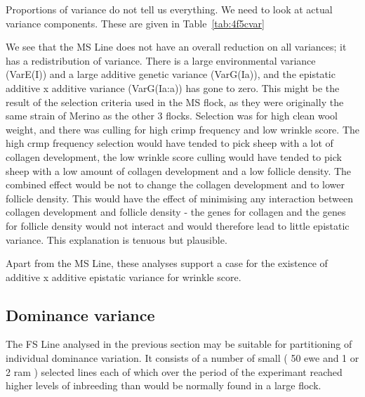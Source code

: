 \documentclass[titlepage]{article}  %
\begin{document}
Proportions of variance do not tell us everything. We need to look at actual variance components. These are given in Table~\ref{tab:4f5cvar}

We see that the MS Line does not have an overall reduction on all variances; it has a redistribution of variance. There is a large environmental variance (VarE(I)) and a large additive genetic variance (VarG(Ia)), and the epistatic additive x additive variance (VarG(Ia:a)) has gone to zero. This might be the result of the selection criteria used in the MS flock, as they were originally the same strain of Merino as the other 3 flocks.  Selection was for high clean wool weight, and there was culling for high crimp frequency and low wrinkle score. The high crmp frequency selection would have tended to pick sheep with a lot of collagen development, the low wrinkle score culling would have tended to pick sheep with a low amount of collagen development and a low follicle density. The combined effect would be not to change the collagen development and to lower follicle density. This would have the effect of minimising any interaction between collagen development and follicle density - the genes for collagen and the genes for follicle density would not interact and would therefore lead to little epistatic variance. This explanation is tenuous but plausible. 

Apart from the MS Line, these analyses support a case for the existence of additive x additive epistatic variance for wrinkle score. 

\subsection{Dominance variance}
The FS Line analysed in the previous section may be suitable for partitioning of individual dominance variation. It consists of a number of small ( 50 ewe and 1 or 2 ram ) selected lines each of which over the period of the experimant reached higher levels of inbreeding than would be normally found in a large flock.
\end{document}
